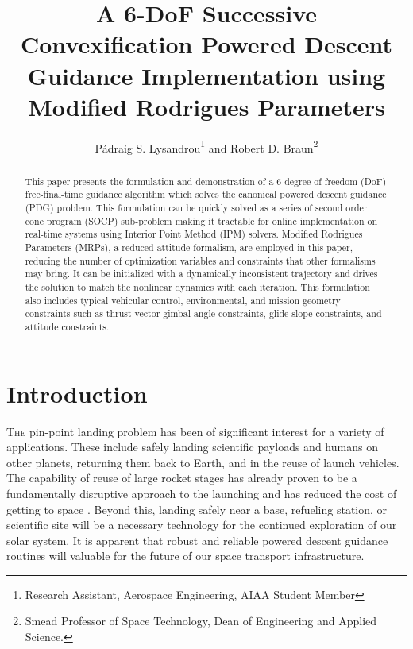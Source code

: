 \documentclass[conf]{new-aiaa}
\title{A 6-DoF Successive Convexification Powered Descent Guidance Implementation using Modified Rodrigues Parameters}
\author{Pádraig S. Lysandrou\footnote{Research Assistant, Aerospace Engineering, AIAA Student Member} and Robert D. Braun\footnote{Smead Professor of Space Technology, Dean of Engineering and Applied Science.}}
\affil{University of Colorado Boulder, Boulder, CO 80309}
\begin{document}
\maketitle

\begin{abstract}
	This paper presents the formulation and demonstration of a 6 degree-of-freedom (DoF) free-final-time guidance algorithm which solves the canonical powered descent guidance (PDG) problem. This formulation can be quickly solved as a series of second order cone program (SOCP) sub-problem making it tractable for online implementation on real-time systems using Interior Point Method (IPM) solvers. Modified Rodrigues Parameters (MRPs), a reduced attitude formalism, are employed in this paper, reducing the number of optimization variables and constraints that other formalisms may bring. It can be initialized with a dynamically inconsistent trajectory and drives the solution to match the nonlinear dynamics with each iteration. This formulation also includes typical vehicular control, environmental, and mission geometry constraints such as thrust vector gimbal angle constraints, glide-slope constraints, and attitude constraints.

\end{abstract}


\section{Introduction}
\lettrine{T}{he} pin-point landing problem has been of significant interest for a variety of applications. These include safely landing scientific payloads and humans on other planets, returning them back to Earth, and in the reuse of launch vehicles. The capability of reuse of large rocket stages has already proven to be a fundamentally disruptive approach to the launching and has reduced the cost of getting to space \cite{jones2018recent}. Beyond this, landing safely near a base, refueling station, or scientific site will be a necessary technology for the continued exploration of our solar system. It is apparent that robust and reliable powered descent guidance routines will valuable for the future of our space transport infrastructure.

\end{document}
